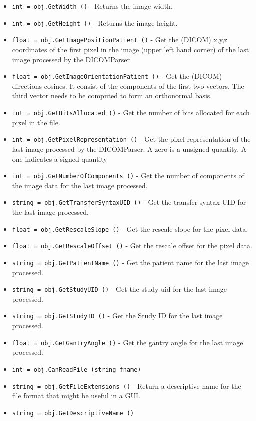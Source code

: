 \begin{itemize}
\item  \verb|int = obj.GetWidth ()| -  Returns the image width.

\item  \verb|int = obj.GetHeight ()| -  Returns the image height.

\item  \verb|float = obj.GetImagePositionPatient ()| -  Get the (DICOM) x,y,z coordinates of the first pixel in the
 image (upper left hand corner) of the last image processed by the
 DICOMParser

\item  \verb|float = obj.GetImageOrientationPatient ()| -  Get the (DICOM) directions cosines. It consist of the components
 of the first two vectors. The third vector needs to be computed
 to form an orthonormal basis.

\item  \verb|int = obj.GetBitsAllocated ()| -  Get the number of bits allocated for each pixel in the file.

\item  \verb|int = obj.GetPixelRepresentation ()| -  Get the pixel representation of the last image processed by the
 DICOMParser. A zero is a unsigned quantity.  A one indicates a
 signed quantity

\item  \verb|int = obj.GetNumberOfComponents ()| -  Get the number of components of the image data for the last
 image processed.

\item  \verb|string = obj.GetTransferSyntaxUID ()| -  Get the transfer syntax UID for the last image processed.

\item  \verb|float = obj.GetRescaleSlope ()| -  Get the rescale slope for the pixel data.

\item  \verb|float = obj.GetRescaleOffset ()| -  Get the rescale offset for the pixel data.

\item  \verb|string = obj.GetPatientName ()| -  Get the patient name for the last image processed.

\item  \verb|string = obj.GetStudyUID ()| -  Get the study uid for the last image processed.

\item  \verb|string = obj.GetStudyID ()| -  Get the Study ID for the last image processed.

\item  \verb|float = obj.GetGantryAngle ()| -  Get the gantry angle for the last image processed.

\item  \verb|int = obj.CanReadFile (string fname)|

\item  \verb|string = obj.GetFileExtensions ()| -  Return a descriptive name for the file format that might be useful in a GUI.

\item  \verb|string = obj.GetDescriptiveName ()|

\end{itemize}
